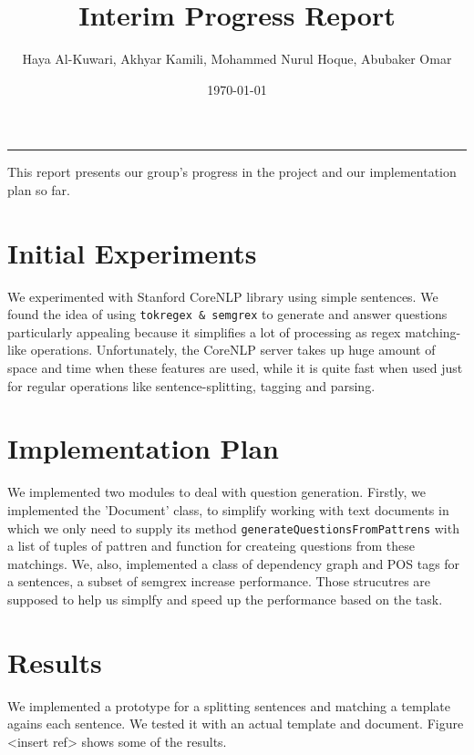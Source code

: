 \documentclass{article}
\title{Interim Progress Report}
\author{Haya Al-Kuwari, Akhyar Kamili, Mohammed Nurul Hoque, Abubaker Omar}
\date{\today}
\begin{document}
    \maketitle
    \noindent\rule{\textwidth}{1pt}
    This report presents our group's progress in the project and our implementation plan so far.

    \section{Initial Experiments}
    We experimented with Stanford CoreNLP library using simple sentences. We found the idea of using
    \texttt{tokregex \& semgrex} to generate and answer questions particularly appealing because it simplifies a lot of processing as
    regex matching-like operations. Unfortunately, the CoreNLP server takes up huge amount of space and
    time when these features are used, while it is quite fast when used just for regular
    operations like sentence-splitting, tagging and parsing.

    \section{Implementation Plan}
    We implemented two modules to deal with question generation. Firstly, we implemented the 'Document' class, to simplify working with text documents in which we only need to supply its method \texttt{generateQuestionsFromPattrens} with a list of tuples of pattren and function for createing questions from these matchings. We, also, implemented a class of dependency graph and POS tags for a sentences, a subset of semgrex increase performance. Those strucutres are supposed to help us simplfy and speed up the performance based on the task.

    \section{Results}
    We implemented a prototype for a splitting sentences and matching a template agains each
    sentence. We tested it with an actual template and document. Figure <insert ref> shows some of
    the results.
    
\end{document}
